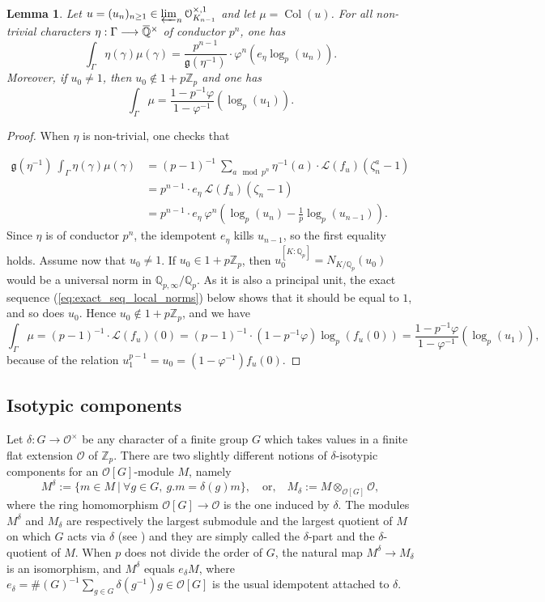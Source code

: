\documentclass[12pt]{amsart}
\newcommand\bQ{\mathbb{Q}}
\newcommand\Zp{{\mathbb{Z}_p}}
\newcommand\Qp{{\mathbb{Q}_p}}
\newcommand\cL{\mathcal{L}}
\newcommand\cO{\mathcal{O}}
\newcommand\g{\mathfrak{g}}
\newcommand{\ob}[1]{\mkern 1.5mu\overline{\mkern-1.5mu#1\mkern-1.5mu}\mkern 1.5mu}
\DeclareMathOperator{\Coleman}{Col}
\theoremstyle{defstyle}
\theoremstyle{thmstyle}
\newtheorem{lemme}[subsubsection]{Lemma}
\begin{document}
\begin{lemme}\label{lem:val_spé_coleman}
	Let $u=(u_n)_{n\geq 1} \in \varprojlim_n \cO^{\times,1}_{K_{n-1}}$ and let $\mu=\Coleman(u)$. For all non-trivial characters $\eta:\Gamma\longrightarrow \ob{\bQ}^\times$ of conductor $p^n$, one has
	$$\int_{\Gamma}\eta(\gamma)\mu(\gamma) = \frac{p^{n-1}}{\g(\eta^{-1})} \cdot \varphi^n\left(e_\eta\log_p(u_n)\right).$$
	Moreover, if $u_0\neq1$, then $u_0\notin1+p\Zp$ and one has
	$$\int_{\Gamma}\mu = \frac{1-p^{-1}\varphi}{1-\varphi^{-1}}\left(\log_p(u_1)\right).$$
\end{lemme}
\begin{proof}
	When $\eta$ is non-trivial, one checks that
	
	\begin{align*}
	\g(\eta^{-1})\ \int_{\Gamma}\eta(\gamma)\mu(\gamma) &=(p-1)^{-1}\ \sum_{a\mod p^n} \eta^{-1}(a)\cdot\cL(f_u)(\zeta_n^a-1) \\
	&= p^{n-1}\cdot e_\eta\ \cL(f_u)(\zeta_n-1) \\
	&= p^{n-1}\cdot e_\eta\  \varphi^n\left(\log_p(u_n)-\frac{1}{p}\log_p(u_{n-1})\right).
	\end{align*}
	Since $\eta$ is of conductor $p^n$, the idempotent $e_\eta$ kills $u_{n-1}$, so the first equality holds. Assume now that $u_0\neq 1$. If $u_0\in 1+p\Zp$, then $u_0^{[K:\Qp]}=N_{K/\Qp}(u_0)$ would be a universal norm in $\bQ_{p,\infty}/\Qp$. As it is also a principal unit, the exact sequence (\ref{eq:exact_seq_local_norms}) below shows that it should be equal to $1$, and so does $u_0$. Hence $u_0 \notin 1+p\Zp$, and we have
	$$  \int_{\Gamma}\mu = (p-1)^{-1}\cdot\cL(f_u)(0)=(p-1)^{-1}\cdot(1-p^{-1}\varphi)\log_p(f_u(0))=\frac{1-p^{-1}\varphi}{1-\varphi^{-1}}\left(\log_p(u_1)\right),$$
	because of the relation $u_1^{p-1}=u_0=(1-\varphi^{-1})f_u(0)$.
\end{proof}

\subsection{Isotypic components}\label{sec:coleman_isotypic}
Let $\delta : G\longrightarrow \cO^\times$ be any character of a finite group $G$ which takes values in a finite flat extension $\cO$ of $\Zp$. There are two slightly different notions of $\delta$-isotypic components for an $\cO[G]$-module $M$, namely
$$M^{\delta}:=\{m\in M\ \big| \ \forall g\in G,\ g.m=\delta(g)m\}, \quad \textrm{or,}\quad M_{\delta}:=M \otimes_{\cO[G]} \cO,$$ 
where the ring homomorphism $\cO[G]\longrightarrow\cO$ is the one induced by $\delta$. The modules $M^{\delta}$ and $M_{\delta}$ are respectively the largest submodule and the largest quotient of $M$ on which $G$ acts via $\delta$ (see \cite[§2]{tsujisemilocal}) and they are simply called the $\delta$-part and the $\delta$-quotient of $M$. When $p$ does not divide the order of $G$, the natural map $M^{\delta}\longrightarrow M_{\delta}$ is an isomorphism, and $M^{\delta}$ equals $e_\delta M$, where $e_\delta=\#(G)^{-1}\sum_{g\in G} \delta(g^{-1})g\in\cO[G]$ is the usual idempotent attached to $\delta$.
\end{document}
